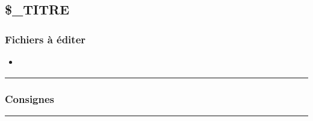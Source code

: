 \documentclass[a4paper,10pt]{article}
\begin{document}
    \color{sec2}
    \subsection{\$\_TITRE}\color{text}

    \color{sec3}
    \subsubsection{Fichiers à éditer}\color{text}

    \begin{itemize}
        \item \textbf{\color{path}\color{text}}
    \end{itemize}



    \color{sec3}\par\noindent\rule{\textwidth}{0.4pt}\color{text}

    \color{sec3}
    \subsubsection{Consignes}\color{text}




    \color{sec2}\par\noindent\rule{\textwidth}{0.4pt}\color{text}
\end{document}
